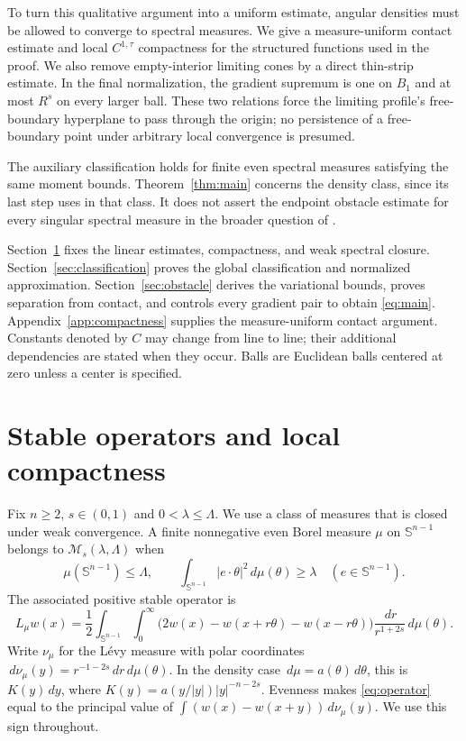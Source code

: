 \documentclass[11pt]{article}
\numberwithin{equation}{section}
\theoremstyle{remark}
\newcommand{\Sph}{\mathbb S^{n-1}}
\newcommand{\abs}[1]{\lvert #1\rvert}
\newcommand{\dd}{\,d}
\newcommand{\M}{\mathcal M_{s}(\lambda,\Lambda)}
\begin{document}
To turn this qualitative argument into a uniform estimate, angular densities must be allowed to converge to spectral measures. We give a measure-uniform contact estimate and local $C^{1,\tau}$ compactness for the structured functions used in the proof. We also remove empty-interior limiting cones by a direct thin-strip estimate. In the final normalization, the gradient supremum is one on $B_1$ and at most $R^s$ on every larger ball. These two relations force the limiting profile's free-boundary hyperplane to pass through the origin; no persistence of a free-boundary point under arbitrary local convergence is presumed.

The auxiliary classification holds for finite even spectral measures satisfying the same moment bounds. Theorem~\ref{thm:main} concerns the density class, since its last step uses \cite[Proposition 5.8]{ROW} in that class. It does not assert the endpoint obstacle estimate for every singular spectral measure in the broader question of \cite{FRO}.

Section~\ref{sec:operators} fixes the linear estimates, compactness, and weak spectral closure. Section~\ref{sec:classification} proves the global classification and normalized approximation. Section~\ref{sec:obstacle} derives the variational bounds, proves separation from contact, and controls every gradient pair to obtain \eqref{eq:main}. Appendix~\ref{app:compactness} supplies the measure-uniform contact argument. Constants denoted by $C$ may change from line to line; their additional dependencies are stated when they occur. Balls are Euclidean balls centered at zero unless a center is specified.
\section{Stable operators and local compactness}\label{sec:operators}

Fix $n\ge2$, $s\in(0,1)$ and $0<\lambda\le\Lambda$. We use a class of measures that is closed under weak convergence. A finite nonnegative even Borel measure $\mu$ on $\Sph$ belongs to $\M$ when
\begin{equation}\label{eq:ellipticity}
 \mu(\Sph)\le\Lambda,
 \qquad \int_{\Sph}\abs{e\cdot\theta}^{2}\dd\mu(\theta)\ge\lambda
 \quad(e\in\Sph).
\end{equation}
The associated positive stable operator is
\begin{equation}\label{eq:operator}
 L_\mu w(x)=\frac12\int_{\Sph}\int_0^\infty
 \bigl(2w(x)-w(x+r\theta)-w(x-r\theta)\bigr)
 \frac{\dd r}{r^{1+2s}}\dd\mu(\theta).
\end{equation}
Write $\nu_\mu$ for the L\'evy measure with polar coordinates
$\dd\nu_\mu(y)=r^{-1-2s}\dd r\dd\mu(\theta)$. In the density case $\dd\mu=a(\theta)\dd\theta$, this is $K(y)\dd y$, where $K(y)=a(y/\abs y)\abs y^{-n-2s}$. Evenness makes \eqref{eq:operator} equal to the principal value of $\int(w(x)-w(x+y))\dd\nu_\mu(y)$. We use this sign throughout.
\end{document}
